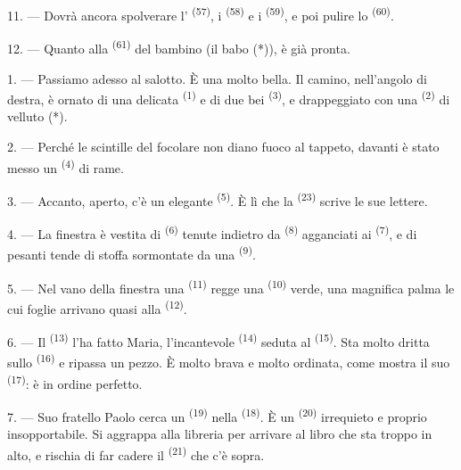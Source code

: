 11. --- Dovrà ancora spolverare l' \textsuperscript{(57)}, i
 \textsuperscript{(58)} e i 
\textsuperscript{(59)}, e poi pulire lo  \textsuperscript{(60)}.

12. --- Quanto alla  \textsuperscript{(61)} del bambino (il babo (*)), è
già pronta.

\VUsaut{5.0mm}
\VUsaut{3.0mm}

1. --- Passiamo adesso al salotto. È una  molto bella. Il camino,
nell'angolo di destra, è ornato di una delicata 
\textsuperscript{(1)} e di due bei  \textsuperscript{(3)}, e drappeggiato
con una  \textsuperscript{(2)} di velluto (*).

2. --- Perché le scintille del focolare non diano fuoco al tappeto, davanti è stato
messo un  \textsuperscript{(4)} di rame.

3. --- Accanto, aperto, c'è un elegante 
\textsuperscript{(5)}. È lì che la  \textsuperscript{(23)}
scrive le sue lettere.

4. --- La finestra è vestita di  \textsuperscript{(6)} tenute indietro
da  \textsuperscript{(8)} agganciati ai 
\textsuperscript{(7)}, e di pesanti tende di stoffa sormontate da una
 \textsuperscript{(9)}.

5. --- Nel vano della finestra una  \textsuperscript{(11)} regge una
 \textsuperscript{(10)} verde, una magnifica palma le cui foglie
arrivano quasi alla  \textsuperscript{(12)}.

6. --- Il  \textsuperscript{(13)} l'ha fatto Maria, l'incantevole
 \textsuperscript{(14)} seduta al 
\textsuperscript{(15)}. Sta molto dritta sullo 
\textsuperscript{(16)} e ripassa un pezzo. È molto brava e molto ordinata, come mostra
il suo  \textsuperscript{(17)}: è in ordine perfetto.

\VUsaut{5.0mm}
\VUsaut{3.0mm}

7. --- Suo fratello Paolo cerca un  \textsuperscript{(19)} nella
 \textsuperscript{(18)}. È un 
\textsuperscript{(20)} irrequieto e proprio insopportabile. Si aggrappa alla libreria
per arrivare al libro che sta troppo in alto, e rischia di far cadere il
 \textsuperscript{(21)} che c'è sopra.

